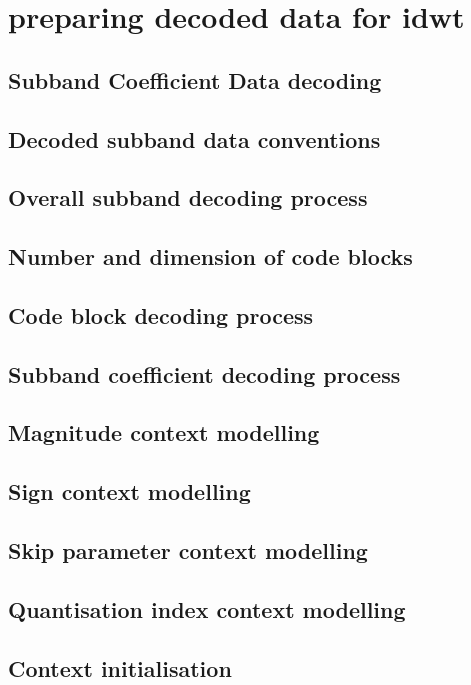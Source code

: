 \clearpage
\section{preparing decoded data for idwt}
\subsection{Subband Coefficient Data decoding}
\subsection{Decoded subband data conventions}
\subsection{Overall subband decoding process}
\subsection{Number and dimension of code blocks}
\subsection{Code block decoding process}
\subsection{Subband coefficient decoding process}
\subsection{Magnitude context modelling}
\subsection{Sign context modelling}
\subsection{Skip parameter context modelling}
\subsection{Quantisation index context modelling}
\subsection{Context initialisation}
